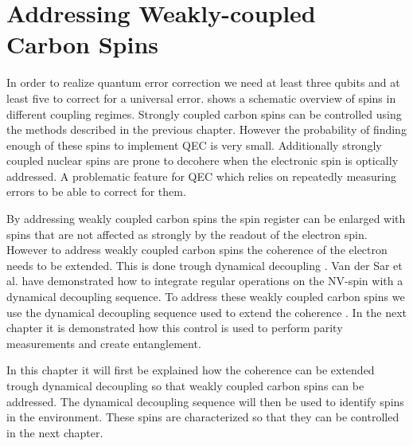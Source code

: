 
\chapter{Addressing Weakly-coupled Carbon Spins}
\label{chap:addressing_weakly_coupled_carbons}

In order to realize quantum error correction we need at least three qubits and at least five to correct for a universal error.
 shows a schematic overview of spins in different coupling regimes.
Strongly coupled carbon spins can be controlled using the methods described in the previous chapter.
However the probability of finding enough of these spins to implement QEC is very small.
Additionally strongly coupled nuclear spins are prone to decohere when the electronic spin is optically addressed.
A problematic feature for QEC which relies on repeatedly measuring errors to be able to correct for them.

By addressing weakly coupled carbon spins the spin register can be enlarged with spins that are not affected as strongly by the readout of the electron spin.
However to address weakly coupled carbon spins the coherence of the electron needs to be extended.
This is done trough dynamical decoupling \citep{Lange2010Universal}.
Van der Sar et al. \citep{Sar2012DecoherenceProtected} have demonstrated how to integrate regular operations on the NV-spin with a dynamical decoupling sequence.
To address these weakly coupled carbon spins we use the dynamical decoupling sequence used to extend the coherence \citep{Taminiau2012Detection}.
In the next chapter it is demonstrated how this control is used to perform parity measurements and create entanglement.

In this chapter it will first be explained how the coherence can be extended trough dynamical decoupling so that weakly coupled carbon spins can be addressed.
The dynamical decoupling sequence will then be used to identify spins in the environment.
These spins are characterized so that they can be controlled in the next chapter.


